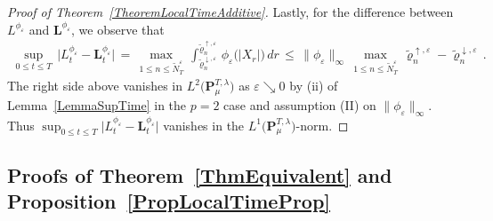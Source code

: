\documentclass[10pt]{article}
\numberwithin{equation}{section}
\theoremstyle{definition}
\begin{document}
\begin{proof}[Proof of Theorem~\ref{TheoremLocalTimeAdditive}]
Lastly, for the difference between $L^{\phi_\varepsilon}$ and $\mathbf{L}^{\phi_\varepsilon}  $, we observe that
\begin{align*}
    \sup_{0\leq t\leq T}\,\big| L_t^{\phi_\varepsilon}  - \mathbf{L}_t^{\phi_\varepsilon}  \big|\,=\,\max_{1\leq n \leq\widetilde{N}_T^{\varepsilon} } \, \int_{ \widetilde{\varrho}_{n}^{\downarrow,\varepsilon} }^{\widetilde{\varrho}_{n}^{\uparrow,\varepsilon} } \,     \phi_{\varepsilon}\big(|X_r|\big)\,dr \,\leq \, \|\phi_{\varepsilon}\|_{\infty}\,\max_{1\leq n \leq\widetilde{N}_T^{\varepsilon} }\,  \widetilde{\varrho}_{n}^{\uparrow,\varepsilon} -\widetilde{\varrho}_{n}^{\downarrow,\varepsilon} \,.
\end{align*}
The right side above vanishes in $L^2\big(\mathbf{P}^{T,\lambda}_{\mu}\big)$ as $\varepsilon\searrow 0$  by  (ii) of Lemma~\ref{LemmaSupTime} in the $p=2$ case and assumption (II) on $\|\phi_{\varepsilon}\|_{\infty}$. Thus $\sup_{0\leq t\leq T}\big|  L_t^{\phi_\varepsilon} - \mathbf{L}_t^{\phi_\varepsilon}  \big|$ vanishes in the $L^1\big(\mathbf{P}^{T,\lambda}_{\mu}\big)$-norm.
\end{proof}


\subsection{Proofs of Theorem~\ref{ThmEquivalent} and Proposition~\ref{PropLocalTimeProp}}\label{SubsectionThmEquivalent}
\end{document}
